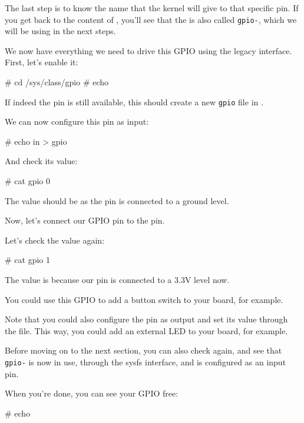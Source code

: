 The last step is to know the name that the kernel will give
to that specific pin. If you get back to the content of
, you'll see that the 
is also called {\tt gpio-\gpionum}, which we will be using in the next steps.

We now have everything we need to drive this GPIO using the legacy
interface. First, let's enable it:

\begin{bashinput}
# cd /sys/class/gpio
# echo %
\end{bashinput}

If indeed the pin is still available, this should create a new
{\tt gpio\gpionum} file in .

We can now configure this pin as input:

\begin{bashinput}
# echo in > gpio%
\end{bashinput}

And check its value:

\begin{bashinput}
# cat gpio%
0
\end{bashinput}

The value should be  as the pin is connected to a ground level.

Now, let's connect our GPIO pin to the  pin.

Let's check the value again:

\begin{bashinput}
# cat gpio%
1
\end{bashinput}

The value is  because our pin is connected to a 3.3V level now.

You could use this GPIO to add a button switch to your board, for
example.

Note that you could also configure the pin as output and set its value
through the  file. This way, you could add an external LED
to your board, for example.

Before moving on to the next section, you can also check
 again, and see that {\tt gpio-\gpionum} is now
in use, through the sysfs interface, and is configured as an input pin.

When you're done, you can see your GPIO free:

\begin{bashinput}
# echo %
\end{bashinput}

